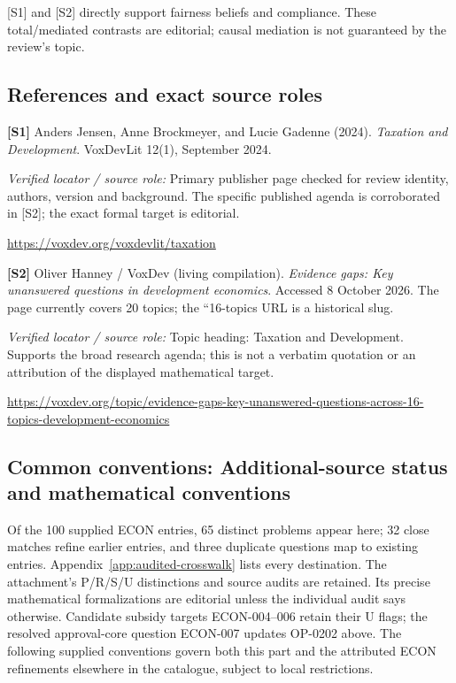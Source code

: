 \documentclass[11pt,a4paper]{article}
\begin{document}
[S1] and [S2] directly support fairness beliefs and compliance. These total/mediated contrasts are editorial; causal mediation is not guaranteed by the review's topic.

\subsection*{References and exact source roles}

{\footnotesize\raggedright
\par\noindent\textbf{[S1]} Anders Jensen, Anne Brockmeyer, and Lucie Gadenne (2024). \emph{Taxation and Development}. VoxDevLit 12(1), September 2024.\par \textit{Verified locator / source role:} Primary publisher page checked for review identity, authors, version and background. The specific published agenda is corroborated in [S2]; the exact formal target is editorial.\par \url{https://voxdev.org/voxdevlit/taxation}\par\smallskip
\par\noindent\textbf{[S2]} Oliver Hanney / VoxDev (living compilation). \emph{Evidence gaps: Key unanswered questions in development economics}. Accessed 8 October 2026. The page currently covers 20 topics; the ``16-topics URL is a historical slug.\par \textit{Verified locator / source role:} Topic heading: Taxation and Development. Supports the broad research agenda; this is not a verbatim quotation or an attribution of the displayed mathematical target.\par \url{https://voxdev.org/topic/evidence-gaps-key-unanswered-questions-across-16-topics-development-economics}\par\smallskip
}

\subsection*{Common conventions: Additional-source status and mathematical conventions}

\label{audited:conventions}

Of the 100 supplied ECON entries, 65 distinct problems appear here; 32 close
matches refine earlier entries, and three duplicate questions map to existing
entries. Appendix~\ref{app:audited-crosswalk} lists every destination.
The attachment's P/R/S/U distinctions and source audits are retained. Its
precise mathematical formalizations are editorial unless the individual audit
says otherwise. Candidate subsidy targets ECON-004--006 retain their U flags;
the resolved approval-core question ECON-007 updates OP-0202 above.
The following supplied conventions govern both this part and the attributed
ECON refinements elsewhere in the catalogue, subject to local restrictions.
\end{document}
